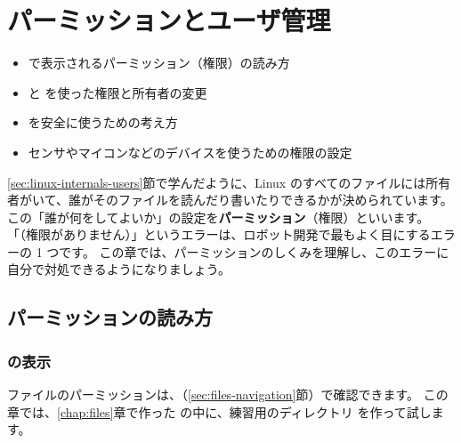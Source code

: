 \chapter{パーミッションとユーザ管理}
\label{chap:permission}

\begin{goalbox}
  \begin{itemize}
    \item {} で表示されるパーミッション（権限）の読み方
    \item {} と  を使った権限と所有者の変更
    \item {} を安全に使うための考え方
    \item センサやマイコンなどのデバイスを使うための権限の設定
  \end{itemize}
\end{goalbox}

\ref{sec:linux-internals-users}節で学んだように、Linux のすべてのファイルには所有者がいて、誰がそのファイルを読んだり書いたりできるかが決められています。
この「誰が何をしてよいか」の設定を\textbf{パーミッション}（権限）といいます。
「（権限がありません）」というエラーは、ロボット開発で最もよく目にするエラーの 1 つです。
この章では、パーミッションのしくみを理解し、このエラーに自分で対処できるようになりましょう。

\section{パーミッションの読み方}
\label{sec:permission-read}

\subsection{ の表示}

ファイルのパーミッションは、（\ref{sec:files-navigation}節）で確認できます。
この章では、\ref{chap:files}章で作った  の中に、練習用のディレクトリ  を作って試します。


